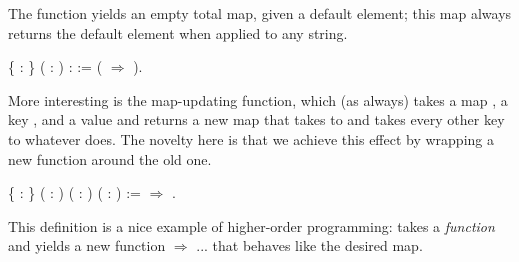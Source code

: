 \documentclass[12pt]{report}
\begin{document}
 The function  yields an empty total map, given a default
    element; this map always returns the default element when applied
    to any string. 
\begin{coqdoccode}
\coqdocemptyline
\coqdocnoindent
{}  \{ : \} ( : ) :   :=\coqdoceol
\coqdocindent{1.00em}
( \coqdocvar{\_} \ensuremath{\Rightarrow} ).\coqdoceol
\coqdocemptyline
\end{coqdoccode}
More interesting is the map-updating function, which (as always)
    takes a map , a key , and a value  and returns a new map
    that takes  to  and takes every other key to whatever 
    does.  The novelty here is that we achieve this effect by wrapping
    a new function around the old one. 
\begin{coqdoccode}
\coqdocemptyline
\coqdocnoindent
{}  \{ : \} ( :  )\coqdoceol
\coqdocindent{10.00em}
( : ) ( : ) :=\coqdoceol
\coqdocindent{1.00em}
  \ensuremath{\Rightarrow}         .\coqdoceol
\coqdocemptyline
\end{coqdoccode}
This definition is a nice example of higher-order programming:
     takes a \textit{function}  and yields a new function
      \ensuremath{\Rightarrow} ... that behaves like the desired map. 
\end{document}
